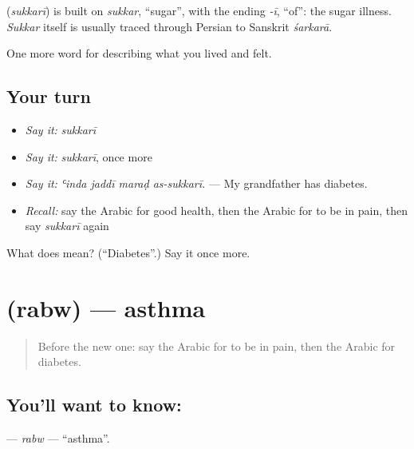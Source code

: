 \begin{cousinweb}
\textbf{} (\emph{sukkarī}) is built on \emph{sukkar}, \textquotedblleft{}sugar\textquotedblright{}, with the ending \emph{-ī}, \textquotedblleft{}of\textquotedblright{}: the sugar illness. \emph{Sukkar} itself is usually traced through Persian to Sanskrit \emph{śarkarā}.
\end{cousinweb}

\begin{grammarlens}[title={What you've built}]
One more word for describing what you lived and felt.
\end{grammarlens}

\subsection*{Your turn}
\begin{itemize}
\raggedright
  \item \emph{Say it:} \emph{sukkarī}
  \item \emph{Say it:} \emph{sukkarī}, once more
  \item \emph{Say it:} \emph{ʿinda jaddī maraḍ as-sukkarī.} — My grandfather has diabetes.
  \item \emph{Recall:} say the Arabic for good health, then the Arabic for to be in pain, then say \emph{sukkarī} again
\end{itemize}

\begin{tcolorbox}[breakable,colback=teal!4,colframe=teal!35!black,title={Before you move on}]
What does  mean? (\textquotedblleft{}Diabetes\textquotedblright{}.) Say it once more.
\end{tcolorbox}
\section[\texorpdfstring{\ar{ربو} (rabw)}{ربو (rabw)}]{ (rabw) — asthma}

\label{lesson:AR-C513-rabw}



\begin{quote}
Before the new one: say the Arabic for to be in pain, then the Arabic for diabetes.
\end{quote}

\subsection*{You'll want to know: }
\textbf{} — \emph{rabw} — \textquotedblleft{}asthma\textquotedblright{}.

